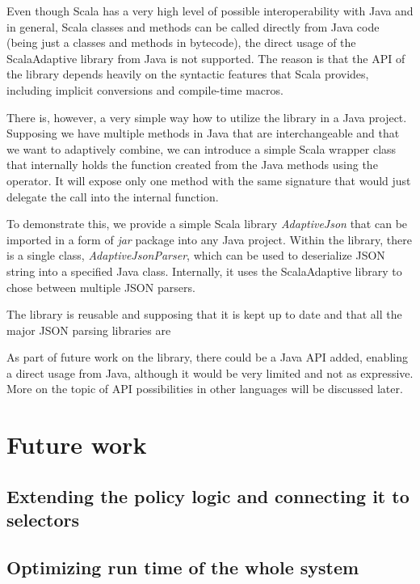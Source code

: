 Even though Scala has a very high level of possible interoperability with Java and in general, Scala classes and methods can be called directly from Java code (being just a classes and methods in bytecode), the direct usage of the ScalaAdaptive library from Java is not supported. The reason is that the API of the library depends heavily on the syntactic features that Scala provides, including implicit conversions and compile-time macros.

There is, however, a very simple way how to utilize the library in a Java project. Supposing we have multiple methods in Java that are interchangeable and that we want to adaptively combine, we can introduce a simple Scala wrapper class that internally holds the function created from the Java methods using the  operator. It will expose only one method with the same signature that would just delegate the call into the internal function.

To demonstrate this, we provide a simple Scala library \textit{AdaptiveJson} that can be imported in a form of \textit{jar} package into any Java project. Within the library, there is a single class, \textit{AdaptiveJsonParser}, which can be used to deserialize JSON string into a specified Java class. Internally, it uses the ScalaAdaptive library to chose between multiple JSON parsers.

The library is reusable and supposing that it is kept up to date and that all the major JSON parsing libraries are 


As part of future work on the library, there could be a Java API added, enabling a direct usage from Java, although it would be very limited and not as expressive. More on the topic of API possibilities in other languages will be discussed later.



\section{Future work}

\subsection{Extending the policy logic and connecting it to selectors}

\subsection{Optimizing run time of the whole system}

